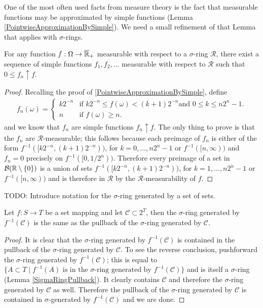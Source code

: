 One of the most often used facts from measure theory is the fact that
measurable functions may be approximated by simple functions (Lemma
\ref{PointwiseApproximationBySimple}).  We need a small refinement of
that Lemma that applies with $\sigma$-rings.
\begin{lem}\label{PointwiseApproximationBySimpleSigmaRing}For any
  function $f : \Omega \to \overline{\mathbb{R}}_+$ 
measurable with respect to a $\sigma$-ring $\mathcal{R}$, there exist a sequence of simple 
  functions $f_1, f_2, \dots$ measurable with respect to $\mathcal{R}$
  such that $0 \leq f_n \uparrow f$.
\end{lem}
\begin{proof}
Recalling the proof of \ref{PointwiseApproximationBySimple}, define
\begin{align*}
f_n(\omega) = 
\begin{cases}k2^{-n} & \text{if $k2^{-n} \leq f(\omega) < (k+1)2^{-n}$
    and $0 \leq k \leq n2^n -1$.} \\
n & \text{if $f(\omega) \geq n$.}
\end{cases}
\end{align*}
and we know that $f_n$ are simple functions $f_n \uparrow f$.  The
only thing to prove is that the $f_n$ are $\mathcal{R}$-measurable;
this follows because each preimage of $f_n$ is either of the form
$f^{-1}([k2^{-n}, (k+1)2^{-n}))$, for $k =0, \dotsc, n2^n -1$ or
$f^{-1}([n, \infty))$ and $f_n=0$ precisely on $f^{-1}([0,1/2^n))$.
Therefore every preimage of a set in $\mathcal{B}(\mathbb{R} \setminus
\lbrace 0 \rbrace)$ is a union of sets $f^{-1}([k2^{-n}, (k+1)2^{-n}))$, for $k =1, \dotsc, n2^n -1$ or
$f^{-1}([n, \infty))$ and is therefore in $\mathcal{R}$ by the
$\mathcal{R}$-measurability of $f$.
\end{proof}

TODO:  Introduce notation for the $\sigma$-ring generated by a
set of sets.

\begin{lem}\label{SigmaRingPullbackGenerators}Let $f : S \to T$ be a set mapping and let $\mathcal{C}
  \subset 2^T$, then the $\sigma$-ring generated by
  $f^{-1}(\mathcal{C})$ is the same as the pullback of the
  $\sigma$-ring generated by $\mathcal{C}$.
\end{lem}
\begin{proof}
It is clear that the $\sigma$-ring generated by $f^{-1}(\mathcal{C})$
is contained in the pullback of the $\sigma$-ring generated by
$\mathcal{C}$.  To see the reverse conclusion, pushforward the
$\sigma$-ring generated by $f^{-1}(\mathcal{C})$; this is equal to
$\lbrace A \subset T \mid f^{-1}(A) \text{ is in the $\sigma$-ring
  generated by } f^{-1}(\mathcal{C})\rbrace$ and is itself a $\sigma$-ring
(Lemma \ref{SigmaRingPullback}).  It clearly contains $\mathcal{C}$ and therefore
the $\sigma$-ring generated by $\mathcal{C}$ as well.  Therefore the
pullback of the $\sigma$-ring generated by $\mathcal{C}$ is contained
in $\sigma$-generated by $f^{-1}(\mathcal{C})$ and we are done.
\end{proof}

